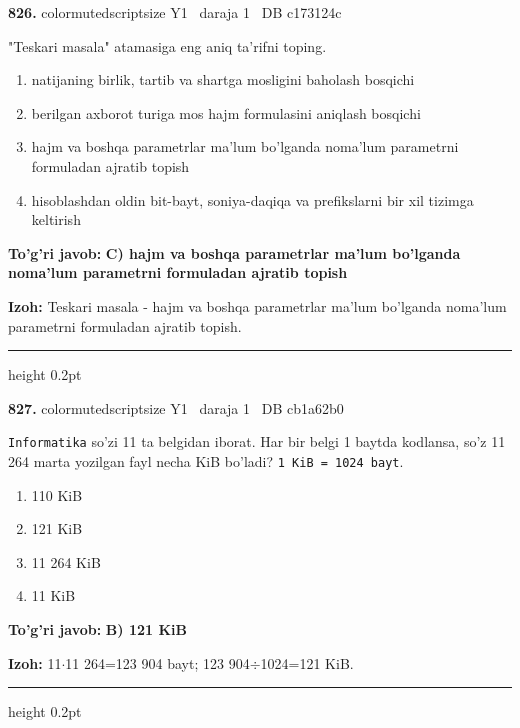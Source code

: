 \documentclass[10pt,a4paper,oneside]{article}
\begin{document}
\noindent\textbf{\color{ink}826.}  {color{muted}scriptsize Y1 \textbullet\ daraja 1 \textbullet\ DB c173124c}
\par
"Teskari masala" atamasiga eng aniq ta'rifni toping.
\begin{enumerate}[label=\Alph*),leftmargin=9mm]
\item natijaning birlik, tartib va shartga mosligini baholash bosqichi
\item berilgan axborot turiga mos hajm formulasini aniqlash bosqichi
\item hajm va boshqa parametrlar ma'lum bo'lganda noma'lum parametrni formuladan ajratib topish
\item hisoblashdan oldin bit-bayt, soniya-daqiqa va prefikslarni bir xil tizimga keltirish
\end{enumerate}
\begin{tcolorbox}[enhanced,breakable,colback=teal!4,colframe=teal!50!black,boxrule=0.5pt,arc=1.1mm,left=3mm,right=3mm,top=1.7mm,bottom=1.7mm,before skip=2mm,after skip=2mm]
\textbf{\color{teal}To'g'ri javob:} \textbf{C) hajm va boshqa parametrlar ma'lum bo'lganda noma'lum parametrni formuladan ajratib topish}
\par\smallskip
\textbf{Izoh:} Teskari masala - hajm va boshqa parametrlar ma'lum bo'lganda noma'lum parametrni formuladan ajratib topish.
\end{tcolorbox}
\vspace{2mm}\hrule height 0.2pt \vspace{3mm}

\noindent\textbf{\color{ink}827.}  {color{muted}scriptsize Y1 \textbullet\ daraja 1 \textbullet\ DB cb1a62b0}
\par
\texttt{Informatika} so'zi 11 ta belgidan iborat. Har bir belgi 1 baytda kodlansa, so'z 11 264 marta yozilgan fayl necha KiB bo'ladi? \texttt{1 KiB = 1024 bayt}.
\begin{enumerate}[label=\Alph*),leftmargin=9mm]
\item 110 KiB
\item 121 KiB
\item 11 264 KiB
\item 11 KiB
\end{enumerate}
\begin{tcolorbox}[enhanced,breakable,colback=teal!4,colframe=teal!50!black,boxrule=0.5pt,arc=1.1mm,left=3mm,right=3mm,top=1.7mm,bottom=1.7mm,before skip=2mm,after skip=2mm]
\textbf{\color{teal}To'g'ri javob:} \textbf{B) 121 KiB}
\par\smallskip
\textbf{Izoh:} 11\ensuremath{\cdot}11 264=123 904 bayt; 123 904\ensuremath{\div}1024=121 KiB.
\end{tcolorbox}
\vspace{2mm}\hrule height 0.2pt \vspace{3mm}
\end{document}
